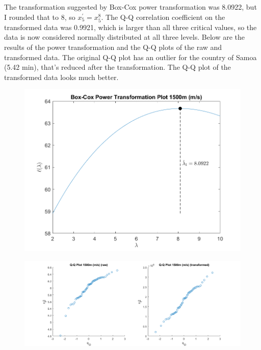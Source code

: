 The transformation suggested by Box-Cox power transformation was 8.0922, but I rounded that to 8, so $x_{5}^{\prime} = x_{5}^{8}$.
The Q-Q correlation coefficient on the transformed data was 0.9921, which is larger than all three critical values, so the data is now considered normally distributed at all three levels.
Below are the results of the power transformation and the Q-Q plots of the raw and transformed data.
The original Q-Q plot has an outlier for the country of Samoa (5.42 min), that's reduced after the transformation. The Q-Q plot of the transformed data looks much better.

\begin{center}
    \begin{figure}[H]
        \centering
        \includegraphics[scale=0.6]{./matlab/chapter-4/sol4.37.power.5.png}
    \end{figure}
\end{center}

\begin{center}
    \begin{figure}[H]
        \centering
        \includegraphics[scale=0.4]{./matlab/chapter-4/sol4.37.qq.5.png}
    \end{figure}
\end{center}

